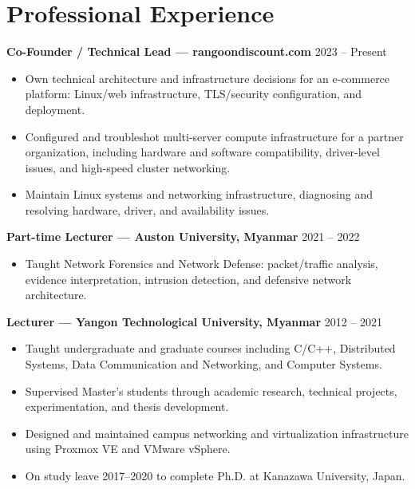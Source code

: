 \section{Professional Experience}

\textbf{Co-Founder / Technical Lead --- rangoondiscount.com} \hfill 2023 -- Present
\begin{itemize}
	\item Own technical architecture and infrastructure decisions for an e-commerce platform: Linux/web infrastructure, TLS/security configuration, and deployment.
	\item Configured and troubleshot multi-server compute infrastructure for a partner organization, including hardware and software compatibility, driver-level issues, and high-speed cluster networking.
	\item Maintain Linux systems and networking infrastructure, diagnosing and resolving hardware, driver, and availability issues.
\end{itemize}

\textbf{Part-time Lecturer --- Auston University, Myanmar} \hfill 2021 -- 2022
\begin{itemize}
	\item Taught Network Forensics and Network Defense: packet/traffic analysis, evidence interpretation, intrusion detection, and defensive network architecture.
\end{itemize}

\textbf{Lecturer --- Yangon Technological University, Myanmar} \hfill 2012 -- 2021
\begin{itemize}
	\item Taught undergraduate and graduate courses including C/C++, Distributed Systems, Data Communication and Networking, and Computer Systems.
	\item Supervised Master's students through academic research, technical projects, experimentation, and thesis development.
	\item Designed and maintained campus networking and virtualization infrastructure using Proxmox VE and VMware vSphere.
	\item On study leave 2017--2020 to complete Ph.D. at Kanazawa University, Japan.
\end{itemize}
